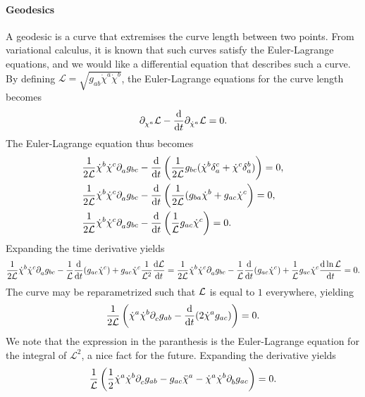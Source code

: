 \paragraph{Geodesics}
A geodesic is a curve that extremises the curve length between two points. From variational calculus, it is known that such curves satisfy the Euler-Lagrange equations, and we would like a differential equation that describes such a curve. By defining $\mathcal{L} = \sqrt{g_{ab}\dot{\chi}^{a}\dot{\chi}^{b}}$, the Euler-Lagrange equations for the curve length becomes
\begin{align*}
	\partial^{}_{\chi^{a}}\mathcal{L} - \dv{t}\partial^{}_{\dot{\chi}^{a}}\mathcal{L} = 0.
\end{align*}
The Euler-Lagrange equation thus becomes
\begin{align*}
	&\frac{1}{2\mathcal{L}}\dot{\chi}^{b}\dot{\chi}^{c}\del{a}{g_{bc}} - \dv{t}\left(\frac{1}{2\mathcal{L}}g_{bc}(\dot{\chi}^{b}\kdelta{a}{c} + \dot{\chi}^{c}\kdelta{a}{b})\right) = 0, \\
	&\frac{1}{2\mathcal{L}}\dot{\chi}^{b}\dot{\chi}^{c}\del{a}{g_{bc}} - \dv{t}\left(\frac{1}{2\mathcal{L}}(g_{ba}\dot{\chi}^{b} + g_{ac}\dot{\chi}^{c}\right) = 0, \\
	&\frac{1}{2\mathcal{L}}\dot{\chi}^{b}\dot{\chi}^{c}\del{a}{g_{bc}} - \dv{t}\left(\frac{1}{\mathcal{L}}g_{ac}\dot{\chi}^{c}\right) = 0.
\end{align*}
Expanding the time derivative yields
\begin{align*}
	\frac{1}{2\mathcal{L}}\dot{\chi}^{b}\dot{\chi}^{c}\partial^{}_{a}g_{bc} - \frac{1}{\mathcal{L}}\dv{t}(g_{ac}\dot{\chi}^{c}) + g_{ac}\dot{\chi}^{c}\frac{1}{\mathcal{L}^{2}}\dv{\ensuremath{\mathcal{L}}}{t} = \frac{1}{2\mathcal{L}}\dot{\chi}^{b}\dot{\chi}^{c}\partial^{}_{a}g_{bc} - \frac{1}{\mathcal{L}}\dv{t}(g_{ac}\dot{\chi}^{c}) + \frac{1}{\mathcal{L}}g_{ac}\dot{\chi}^{c}\dv{\ln{\ensuremath{\mathcal{L}}}}{t} = 0.
\end{align*}
The curve may be reparametrized such that $\mathcal{L}$ is equal to $1$ everywhere, yielding
\begin{align*}
	\frac{1}{2\mathcal{L}}\left(\dot{\chi}^{a}\dot{\chi}^{b}\partial^{}_{c}g_{ab} - \dv{t}(2\dot{\chi}^{a}g_{ac})\right) = 0.
\end{align*}
We note that the expression in the paranthesis is the Euler-Lagrange equation for the integral of $\mathcal{L}^{2}$, a nice fact for the future. Expanding the derivative yields
\begin{align*}
	\frac{1}{\mathcal{L}}\left(\frac{1}{2}\dot{\chi}^{a}\dot{\chi}^{b}\partial^{}_{c}g_{ab} - g_{ac}\ddot{\chi}^{a} - \dot{\chi}^{a}\dot{\chi}^{b}\partial^{}_{b}g_{ac}\right) = 0.
\end{align*}
